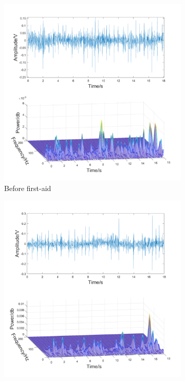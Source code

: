 \begin{figure}[h]
\begin{subfigure}{.4\linewidth}
        \includegraphics[width=1\linewidth]{figs/disscussion/d.png}
        \caption{Before first-aid}
        \label{FIG:Time&Frequency.d}
    \end{subfigure}\hfill
    \begin{subfigure}{.4\linewidth}
        \centering
        \includegraphics[width=1\linewidth]{figs/disscussion/e.png}

\end{subfigure}
\end{figure}
